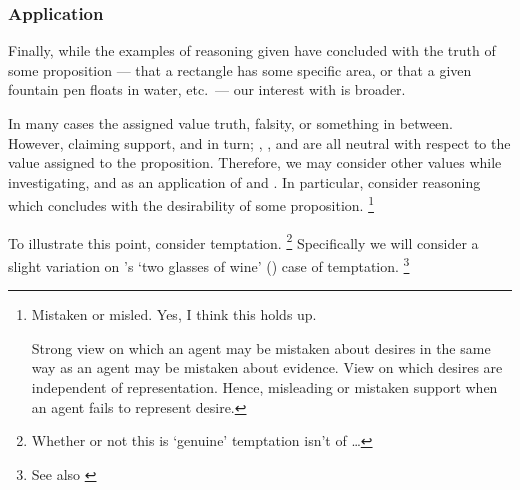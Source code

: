 \subsubsection{Application}
\label{sec:application}

\begin{note}[Desire]
  Finally, while the examples of reasoning given have concluded with the truth of some proposition --- that a rectangle has some specific area, or that a given fountain pen floats in water, etc.\ --- our interest with \EAS{} is broader.

  In many cases the assigned value truth, falsity, or something in between.
  However, claiming support, and in turn; \USE{}, \ESU{}, and \EAS{} are all neutral with respect to the value assigned to the proposition.
  Therefore, we may consider other values while investigating, and as an application of \ESU{} and \EAS{}.
  In particular, consider reasoning which concludes with the desirability of some proposition.\nolinebreak
  \footnote{
    \color{red}
    Mistaken or misled.
    Yes, I think this holds up.

    Strong view on which an agent may be mistaken about desires in the same way as an agent may be mistaken about evidence.
    View on which desires are independent of representation.
    Hence, misleading or mistaken support when an agent fails to represent desire.
  }

  To illustrate this point, consider temptation.\nolinebreak
  \footnote{
    \color{red}
    Whether or not this is `genuine' temptation isn't of \dots
  }
  Specifically we will consider a slight variation on \citeauthor{Bratman:1999ac}'s `two glasses of wine' (\Citeyear[38]{Bratman:1999ac}) case of temptation.\nolinebreak
  \footnote{
    \color{red}
    See also \textcite{Bratman:2007ab}
  }
\end{note}

